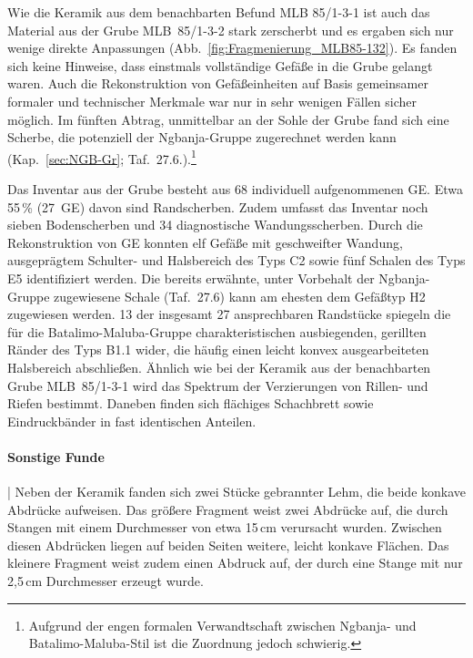 Wie die Keramik aus dem benachbarten Befund MLB 85/1-3-1 ist auch das Material aus der Grube MLB~85/1-3-2 stark zerscherbt und es ergaben sich nur wenige direkte Anpassungen (Abb.~\ref{fig:Fragmenierung_MLB85-132}). Es fanden sich keine Hinweise, dass einstmals vollständige Gefäße in die Grube gelangt waren. Auch die Rekonstruktion von Gefäßeinheiten auf Basis gemeinsamer formaler und technischer Merkmale war nur in sehr wenigen Fällen sicher möglich. Im fünften Abtrag, unmittelbar an der Sohle der Grube fand sich eine Scherbe, die potenziell der \mbox{Ngbanja}-Gruppe zugerechnet werden kann (Kap.~\ref{sec:NGB-Gr}; Taf.~27.6.).\footnote{Aufgrund der engen formalen Verwandtschaft zwischen \mbox{Ngbanja}- und Batalimo-Maluba-Stil ist die Zuordnung jedoch schwierig.}

Das Inventar aus der Grube besteht aus 68 individuell aufgenommenen GE. Etwa 55\,\% (27~GE) davon sind Randscherben. Zudem umfasst das Inventar noch sieben Bodenscherben und 34 diagnostische Wandungsscherben. Durch die Rekonstruktion von GE konnten elf Gefäße mit geschweifter Wandung, ausgeprägtem Schulter- und Halsbereich des Typs C2 sowie fünf Schalen des Typs E5 identifiziert werden. Die bereits erwähnte, unter Vorbehalt der \mbox{Ngbanja}-Gruppe zugewiesene Schale (Taf.~27.6) kann am ehesten dem Gefäßtyp H2 zugewiesen werden. 13 der insgesamt 27 ansprechbaren Randstücke spiegeln die für die Batalimo-Maluba-Gruppe charakteristischen ausbiegenden, gerillten Ränder des Typs B1.1 wider, die häufig einen leicht konvex ausgearbeiteten Halsbereich abschließen. Ähnlich wie bei der Keramik aus der benachbarten Grube MLB~85/1-3-1 wird das Spektrum der Verzierungen von Rillen- und Riefen bestimmt. Daneben finden sich flächiges Schachbrett sowie Eindruckbänder in fast identischen Anteilen.

\paragraph{Sonstige Funde}\hspace{-.5em}|\hspace{.5em}%
Neben der Keramik fanden sich zwei Stücke gebrannter Lehm, die beide konkave Abdrücke aufweisen. Das größere Fragment weist zwei Abdrücke auf, die durch Stangen mit einem Durchmesser von etwa 15\,cm verursacht wurden. Zwischen diesen Abdrücken liegen auf beiden Seiten weitere, leicht konkave Flächen. Das kleinere Fragment weist zudem einen Abdruck auf, der durch eine Stange mit nur 2,5\,cm Durchmesser erzeugt wurde.


